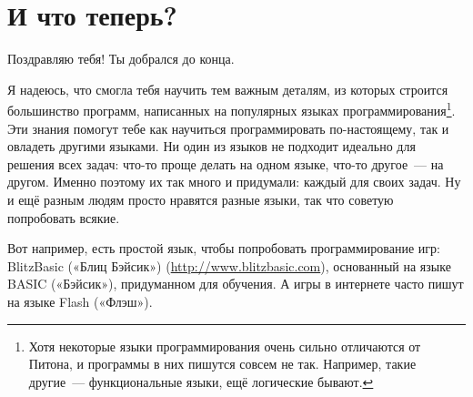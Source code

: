 

\chapter{И что теперь?}

Поздравляю тебя! Ты добрался до конца.

Я надеюсь, что смогла тебя научить тем важным деталям, из которых строится большинство программ, написанных на популярных языках программирования\footnote{Хотя некоторые языки программирования очень сильно отличаются от Питона, и программы в них пишутся совсем не так. Например, такие другие — функциональные языки, ещё логические бывают.}. Эти знания помогут тебе как научиться программировать по-настоящему, так и овладеть другими языками. Ни один из языков не подходит идеально для решения всех задач: что-то проще делать на одном языке, что-то другое — на другом. Именно поэтому их так много и придумали: каждый для своих задач. Ну и ещё разным людям просто нравятся разные языки, так что советую попробовать всякие.

Вот например, есть простой язык, чтобы попробовать программирование игр: BlitzBasic («Блиц Бэйсик») (\url{http://www.blitzbasic.com}), основанный на языке BASIC («Бэйсик»), придуманном для обучения. А игры в интернете часто пишут на языке Flash («Флэш»).

